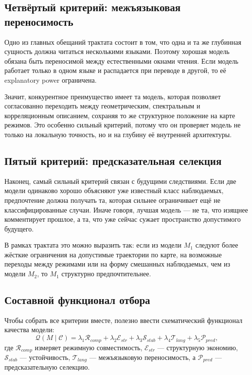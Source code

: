 \documentclass[12pt,a4paper]{article}
\begin{document}
\subsection{Четвёртый критерий: межъязыковая переносимость}

Одно из главных обещаний трактата состоит в том, что одна и та же глубинная сущность должна читаться несколькими языками. Поэтому хорошая модель обязана быть переносимой между естественными окнами чтения. Если модель работает только в одном языке и распадается при переводе в другой, то её explanatory power ограничена.

Значит, конкурентное преимущество имеет та модель, которая позволяет согласованно переходить между геометрическим, спектральным и корреляционным описанием, сохраняя то же структурное положение на карте режимов. Это особенно сильный критерий, потому что он проверяет модель не только на локальную точность, но и на глубину её внутренней архитектуры.

\subsection{Пятый критерий: предсказательная селекция}

Наконец, самый сильный критерий связан с будущими следствиями. Если две модели одинаково хорошо объясняют уже известный класс наблюдаемых, предпочтение должна получать та, которая сильнее ограничивает ещё не классифицированные случаи. Иначе говоря, лучшая модель --- не та, что изящнее комментирует прошлое, а та, что уже сейчас сужает пространство допустимого будущего.

В рамках трактата это можно выразить так: если из модели \(M_1\) следуют более жёсткие ограничения на допустимые траектории по карте, на возможные переходы между режимами или на форму смешанных наблюдаемых, чем из модели \(M_2\), то \(M_1\) структурно предпочтительнее.

\subsection{Составной функционал отбора}

Чтобы собрать все критерии вместе, полезно ввести схематический функционал качества модели:
\begin{equation}
\mathcal{Q}(M\mid \mathcal{C}) =
\lambda_1 \mathcal{R}_{comp}
+ \lambda_2 \mathcal{E}_{str}
+ \lambda_3 \mathcal{S}_{stab}
+ \lambda_4 \mathcal{T}_{lang}
+ \lambda_5 \mathcal{P}_{pred},
\end{equation}
где \(\mathcal{R}_{comp}\) измеряет режимную совместимость, \(\mathcal{E}_{str}\) --- структурную экономию, \(\mathcal{S}_{stab}\) --- устойчивость, \(\mathcal{T}_{lang}\) --- межъязыковую переносимость, а \(\mathcal{P}_{pred}\) --- предсказательную селекцию.
\end{document}
